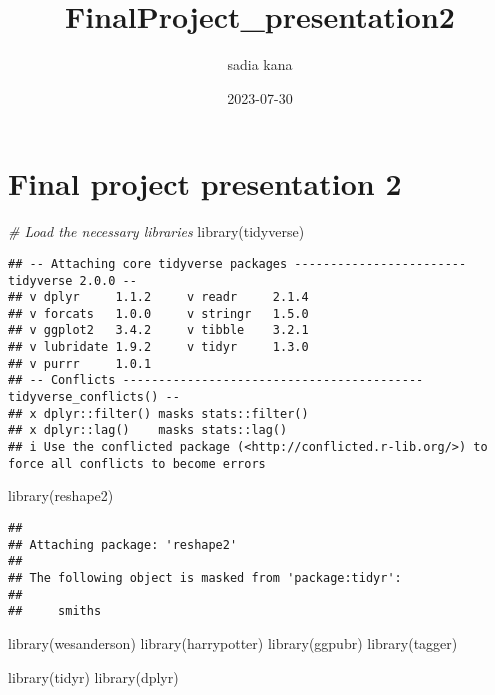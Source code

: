 \documentclass[
]{article}
\title{FinalProject\_presentation2}
\author{sadia kana}
\date{2023-07-30}
\newenvironment{Shaded}{\begin{snugshade}}{\end{snugshade}}
\newcommand{\CommentTok}[1]{\textcolor[rgb]{0.56,0.35,0.01}{\textit{#1}}}
\newcommand{\FunctionTok}[1]{\textcolor[rgb]{0.00,0.00,0.00}{#1}}
\newcommand{\NormalTok}[1]{#1}
\begin{document}
\maketitle

\hypertarget{final-project-presentation-2}{%
\section{Final project presentation
2}\label{final-project-presentation-2}}

\begin{Shaded}
\begin{Highlighting}[]
\CommentTok{\# Load the necessary libraries}
\FunctionTok{library}\NormalTok{(tidyverse)}
\end{Highlighting}
\end{Shaded}

\begin{verbatim}
## -- Attaching core tidyverse packages ------------------------ tidyverse 2.0.0 --
## v dplyr     1.1.2     v readr     2.1.4
## v forcats   1.0.0     v stringr   1.5.0
## v ggplot2   3.4.2     v tibble    3.2.1
## v lubridate 1.9.2     v tidyr     1.3.0
## v purrr     1.0.1     
## -- Conflicts ------------------------------------------ tidyverse_conflicts() --
## x dplyr::filter() masks stats::filter()
## x dplyr::lag()    masks stats::lag()
## i Use the conflicted package (<http://conflicted.r-lib.org/>) to force all conflicts to become errors
\end{verbatim}

\begin{Shaded}
\begin{Highlighting}[]
\FunctionTok{library}\NormalTok{(reshape2)}
\end{Highlighting}
\end{Shaded}

\begin{verbatim}
## 
## Attaching package: 'reshape2'
## 
## The following object is masked from 'package:tidyr':
## 
##     smiths
\end{verbatim}

\begin{Shaded}
\begin{Highlighting}[]
\FunctionTok{library}\NormalTok{(wesanderson)}
\FunctionTok{library}\NormalTok{(harrypotter)}
\FunctionTok{library}\NormalTok{(ggpubr)}
\FunctionTok{library}\NormalTok{(tagger)}

\FunctionTok{library}\NormalTok{(tidyr)}
\FunctionTok{library}\NormalTok{(dplyr)}
\end{Highlighting}
\end{Shaded}
\end{document}
